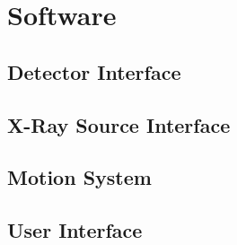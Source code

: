 \chapter{Software}
    \section{Detector Interface}
        \lipsum
    \section{X-Ray Source Interface}
        \lipsum
    \section{Motion System}
        \lipsum
    \section{User Interface}
        \lipsum